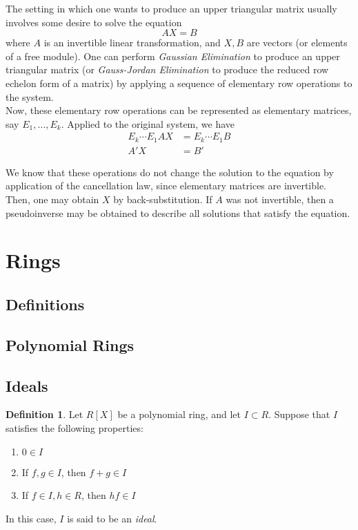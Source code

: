 \documentclass{amsart}
\theoremstyle{definition}
\newtheorem{definition}[theorem]{Definition}
\theoremstyle{remark}
\numberwithin{equation}{section}
\begin{document}
The setting in which one wants to produce an upper triangular matrix usually involves some desire to solve the equation
\begin{equation*}
  AX = B
\end{equation*}
where $A$ is an invertible linear transformation, and $X, B$ are vectors (or elements of a free module). One can perform \emph{Gaussian Elimination} to produce an upper triangular matrix (or \emph{Gauss-Jordan Elimination} to produce the reduced row echelon form of a matrix) by applying a sequence of elementary row operations to the system. \\

Now, these elementary row operations can be represented as elementary matrices, say $E_1, \ldots, E_k$. Applied to the original system, we have
\begin{align*}
  E_k \cdots E_1 AX &= E_k \cdots E_1 B\\
  A'X &= B'
\end{align*}

We know that these operations do not change the solution to the equation by application of the cancellation law, since elementary matrices are invertible. Then, one may obtain $X$ by back-substitution. If $A$ was not invertible, then a pseudoinverse may be obtained to describe all solutions that satisfy the equation.

\section{Rings}
\label{seq:rings}

\subsection{Definitions}

\subsection{Polynomial Rings}

\subsection{Ideals}

\begin{definition}
  Let $R[X]$ be a polynomial ring, and let $I \subset R$. Suppose that $I$ satisfies the following properties:
  \begin{enumerate}[i]
  \item $0 \in I$
  \item If $f, g \in I$, then $f + g \in I$
  \item If $f \in I, h \in R$, then $hf \in I$
  \end{enumerate}
  In this case, $I$ is said to be an \emph{ideal}.
\end{definition}
\end{document}
